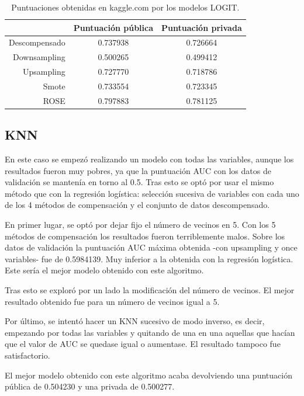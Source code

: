 \documentclass[11pt,a4paper,spanish]{article} %
\begin{document}
\begin{table}[!htbp]
\begin{center}
\begin{tabular}{rcc}
  \hline
& Puntuación pública & Puntuación privada \\ 
  \hline
Descompensado &  0.737938 & 0.726664  \\ 
Downsampling &  0.500265 & 0.499412 \\ 
Upsampling &  0.727770 & 0.718786 \\ 
Smote &  0.733554 & 0.723345 \\ 
ROSE &  0.797883 & 0.781125 \\ 
   \hline
\end{tabular}
\end{center}
\caption{Puntuaciones obtenidas en kaggle.com por los modelos LOGIT.}
\end{table}

\subsection{KNN}
En este caso se empezó realizando un modelo con todas las variables, aunque los resultados fueron muy pobres, ya que la puntuación AUC con los datos de validación se mantenía en torno al 0.5. Tras esto se optó por usar el mismo método que con la regresión logística: selección sucesiva de variables con cada uno de los 4 métodos de compensación y el conjunto de datos descompensado. 

En primer lugar, se optó por dejar fijo el número de vecinos en 5. Con los 5 métodos de compensación los resultados fueron terriblemente malos. Sobre los datos de validación la puntuación AUC máxima obtenida -con upsampling y once variables- fue de 0.5984139. Muy inferior a la obtenida con la regresión logística. Este sería el mejor modelo obtenido con este algoritmo. 

Tras esto se exploró por un lado la modificación del número de vecinos. El mejor resultado obtenido fue para un número de vecinos igual a 5. 

Por último, se intentó hacer un KNN sucesivo de modo inverso, es decir, empezando por todas las variables y quitando de una en una aquellas que hacían que el valor de AUC se quedase igual o aumentase. El resultado tampoco fue satisfactorio.

El mejor modelo obtenido con este algoritmo acaba devolviendo una puntuación pública de 0.504230 y una privada de 0.500277.

\vspace{0.5cm}
\end{document}

